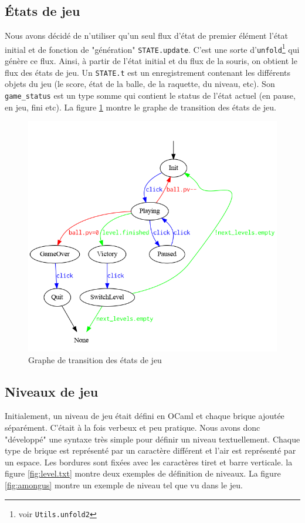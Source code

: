 \documentclass[french]{template}
\begin{document}
\subsection{États de jeu}

Nous avons décidé de n'utiliser qu'un seul flux d'état de premier élément l'état initial et de fonction de "génération" \texttt{STATE.update}. C'est une sorte d'\texttt{unfold}\footnote{voir \texttt{Utils.unfold2}} qui génère ce flux. Ainsi, à partir de l'état initial et du flux de la souris, on obtient le flux des états de jeu. Un \texttt{STATE.t} est un enregistrement contenant les différents objets du jeu (le score, état de la balle, de la raquette, du niveau, etc). Son \texttt{game\_status} est un type somme qui contient le status de l'état actuel (en pause, en jeu, fini etc). La figure \ref{fig:graph} montre le graphe de transition des états de jeu.

\begin{figure}
    \centering
    \includegraphics[width=\textwidth]{img/graph.png}
    \caption{Graphe de transition des états de jeu}
    \label{fig:graph}
\end{figure}

\subsection{Niveaux de jeu}

Initialement, un niveau de jeu était défini en OCaml et chaque brique ajoutée séparément. C'était à la fois verbeux et peu pratique. Nous avons donc "développé" une syntaxe très simple pour définir un niveau textuellement. Chaque type de brique est représenté par un caractère différent et l'air est représenté par un espace. Les bordures sont fixées avec les caractères tiret et barre verticale. la figure \ref{fig:level.txt} montre deux exemples de définition de niveaux. La figure \ref{fig:amongus} montre un exemple de niveau tel que vu dans le jeu.
\end{document}

